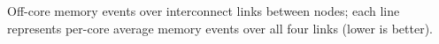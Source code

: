 \label{fig:congestion:likwid}Off-core memory events over interconnect links between nodes; each line represents per-core average memory events over all four links (lower is better).